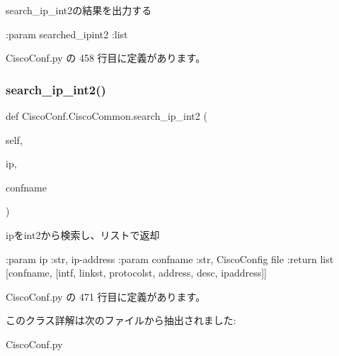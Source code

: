 \begin{DoxyVerb}search_ip_int2の結果を出力する

:param searched_ipint2 :list
\end{DoxyVerb}
 

 Cisco\+Conf.\+py の 458 行目に定義があります。

\mbox{\label{classCiscoConf_1_1CiscoCommon_acb6b75d07a3f0c643b3527ea81516d9a}} 
\subsubsection{\texorpdfstring{search\_ip\_int2()}{search\_ip\_int2()}}
{\footnotesize\ttfamily def Cisco\+Conf.\+Cisco\+Common.\+search\+\_\+ip\+\_\+int2 (\begin{DoxyParamCaption}\item[{}]{self,  }\item[{}]{ip,  }\item[{}]{confname }\end{DoxyParamCaption})}

\begin{DoxyVerb}ipをint2から検索し、リストで返却

:param  ip       :str, ip-address
:param  confname :str, CiscoConfig file
:return list [confname, [intf, linkst, protocolst, address, desc, ipaddress]]
\end{DoxyVerb}
 

 Cisco\+Conf.\+py の 471 行目に定義があります。



このクラス詳解は次のファイルから抽出されました\+:\begin{DoxyCompactItemize}
\item 
Cisco\+Conf.\+py\end{DoxyCompactItemize}
